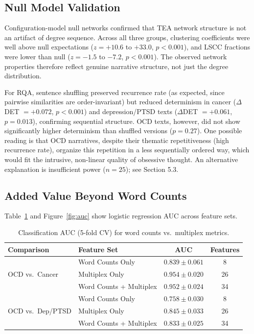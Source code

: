 \documentclass[11pt,a4paper]{article}
\begin{document}
\subsection{Null Model Validation}

Configuration-model null networks confirmed that TEA network structure is not an artifact of degree sequence.  Across all three groups, clustering coefficients were well above null expectations ($z = +10.6$ to $+33.0$, $p < 0.001$), and LSCC fractions were lower than null ($z = -1.5$ to $-7.2$, $p < 0.001$).  The observed network properties therefore reflect genuine narrative structure, not just the degree distribution.

For RQA, sentence shuffling preserved recurrence rate (as expected, since pairwise similarities are order-invariant) but reduced determinism in cancer ($\Delta$DET $= +0.072$, $p < 0.001$) and depression/PTSD texts ($\Delta$DET $= +0.061$, $p = 0.013$), confirming sequential structure.  OCD texts, however, did not show significantly higher determinism than shuffled versions ($p = 0.27$).  One possible reading is that OCD narratives, despite their thematic repetitiveness (high recurrence rate), organize this repetition in a less sequentially ordered way, which would fit the intrusive, non-linear quality of obsessive thought.  An alternative explanation is insufficient power ($n=25$); see Section 5.3.

\subsection{Added Value Beyond Word Counts}
\label{sec:auc}

Table~\ref{tab:auc} and Figure~\ref{fig:auc} show logistic regression AUC across feature sets.

\begin{table}[ht]
\centering
\caption{Classification AUC (5-fold CV) for word counts vs.\ multiplex metrics.}
\label{tab:auc}
\begin{tabular}{llcc}
\toprule
\textbf{Comparison} & \textbf{Feature Set} & \textbf{AUC} & \textbf{Features} \\
\midrule
\multirow{3}{*}{OCD vs.\ Cancer}
& Word Counts Only & $0.839 \pm 0.061$ & 8 \\
& Multiplex Only & $0.954 \pm 0.020$ & 26 \\
& Word Counts + Multiplex & $0.952 \pm 0.024$ & 34 \\
\midrule
\multirow{3}{*}{OCD vs.\ Dep/PTSD}
& Word Counts Only & $0.758 \pm 0.030$ & 8 \\
& Multiplex Only & $0.845 \pm 0.033$ & 26 \\
& Word Counts + Multiplex & $0.833 \pm 0.025$ & 34 \\
\bottomrule
\end{tabular}
\end{table}
\end{document}
